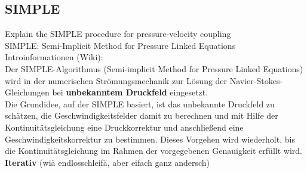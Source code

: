 \documentclass[a4paper]{scrartcl}
\begin{document}
\subsection{SIMPLE}
Explain the SIMPLE procedure for pressure-velocity coupling\\
\newline
SIMPLE: Semi-Implicit Method for Pressure Linked Equations\\
Introinformationen (Wiki):\\
Der SIMPLE-Algorithmus (Semi-implicit Method for Pressure Linked Equations) wird
in der numerischen Strömungsmechanik zur Lösung der Navier-Stokes-Gleichungen
bei \textbf{unbekanntem Druckfeld} eingesetzt.\\
Die Grundidee, auf der SIMPLE basiert, ist das unbekannte Druckfeld zu schätzen,
die Geschwindigkeitsfelder damit zu berechnen und mit Hilfe der
Kontinuitätsgleichung eine Druckkorrektur und anschließend eine
Geschwindigkeitskorrektur zu bestimmen. Dieses Vorgehen wird wiederholt, bis die
Kontinuitätsgleichung im Rahmen der vorgegebenen Genauigkeit erfüllt wird.\\
\textbf{Iterativ} (wiä endlosschleifä, aber eifach ganz andersch)\\
\end{document}
